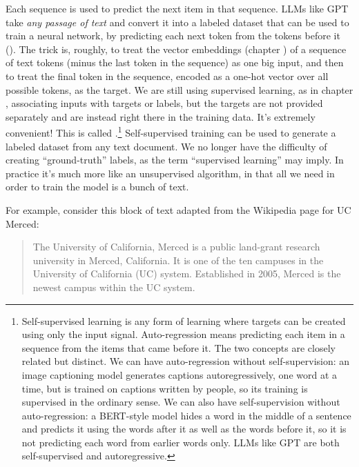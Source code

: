 Each sequence is used to predict the next item in that sequence.
LLMs like GPT take \emph{any passage of text} and convert it into a labeled
dataset that can be used to train a neural network, by predicting each next
token from the tokens before it (). The trick is, roughly, to treat the vector
embeddings (chapter ) of a sequence of text tokens (minus the last token in the sequence)
as one big input, and then to treat the final token in
the sequence, encoded as a one-hot vector over all possible tokens, as the target.
We are still using supervised learning, as in chapter ,
associating inputs with targets or labels, but the targets are not provided
separately and are instead right there in the training data. It's extremely
convenient!  This is called .\footnote{Self-supervised learning
is any form of learning where targets can be created using only the input signal. Auto-regression means predicting each item in a sequence from the items that came before it. The two concepts are closely related but distinct. We can have auto-regression without self-supervision: an image captioning model generates captions autoregressively, one word at a time, but is trained on captions written by people, so its training is supervised in the ordinary sense. We can also have self-supervision without auto-regression: a BERT-style model hides a word in the middle of a sentence and predicts it using the words after it as well as the words before it, so it is not predicting each word from earlier words only. LLMs like GPT are both self-supervised and autoregressive.}
Self-supervised training can be used to generate a labeled dataset
from any text document. We no longer have the difficulty of creating
``ground-truth'' labels, as the term ``supervised learning'' may imply. In
practice it's much more like an unsupervised algorithm, in that all we need in
order to train the model is a bunch of text.

For example, consider this block of text adapted from the Wikipedia page for UC
Merced:

\begin{quote}
The University of California, Merced is a public land-grant research university
in Merced, California. It is one of the ten campuses in the University of
California (UC) system. Established in 2005, Merced is the newest campus within
the UC system.
\end{quote}

